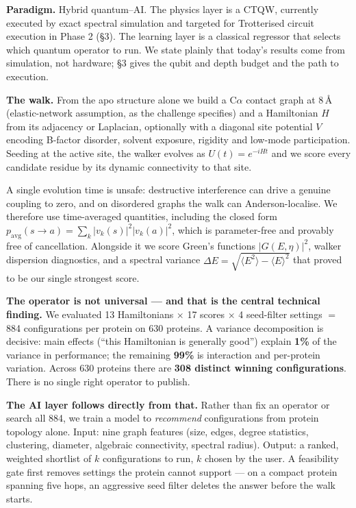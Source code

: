 \documentclass[10pt,a4paper,twocolumn]{article}
\newcommand{\num}[1]{\textbf{#1}}
\begin{document}
\textbf{Paradigm.} Hybrid quantum--AI. The physics layer is a CTQW, currently executed by exact
spectral simulation and targeted for Trotterised circuit execution in Phase 2 (\S3). The learning
layer is a classical regressor that selects which quantum operator to run. We state plainly that
today's results come from simulation, not hardware; \S3 gives the qubit and depth budget and the
path to execution.

\textbf{The walk.} From the apo structure alone we build a C$\alpha$ contact graph at 8\,\AA{}
(elastic-network assumption, as the challenge specifies) and a Hamiltonian $H$ from its adjacency
or Laplacian, optionally with a diagonal site potential $V$ encoding B-factor disorder, solvent
exposure, rigidity and low-mode participation. Seeding at the active site, the walker evolves as
$U(t)=e^{-iHt}$ and we score every candidate residue by its dynamic connectivity to that site.

A single evolution time is unsafe: destructive interference can drive a genuine coupling to zero,
and on disordered graphs the walk can Anderson-localise. We therefore use time-averaged
quantities, including the closed form
$p_{\mathrm{avg}}(s\!\to\!a)=\sum_k |v_k(s)|^2|v_k(a)|^2$,
which is parameter-free and provably free of cancellation. Alongside it we score Green's functions
$|G(E,\eta)|^2$, walker dispersion diagnostics, and a spectral variance
$\Delta E=\sqrt{\langle E^2\rangle-\langle E\rangle^2}$ that proved to be our single strongest
score.

\textbf{The operator is not universal --- and that is the central technical finding.} We evaluated
13 Hamiltonians $\times$ 17 scores $\times$ 4 seed-filter settings $=$ 884 configurations per
protein on 630 proteins. A variance decomposition is decisive: main effects (``this Hamiltonian is
generally good'') explain \num{1\%} of the variance in performance; the remaining \num{99\%} is
interaction and per-protein variation. Across 630 proteins there are \num{308 distinct winning
configurations}. There is no single right operator to publish.

\textbf{The AI layer follows directly from that.} Rather than fix an operator or search all 884,
we train a model to \emph{recommend} configurations from protein topology alone. Input: nine graph
features (size, edges, degree statistics, clustering, diameter, algebraic connectivity, spectral
radius). Output: a ranked, weighted shortlist of $k$ configurations to run, $k$ chosen by the user.
A feasibility gate first removes settings the protein cannot support --- on a compact protein
spanning five hops, an aggressive seed filter deletes the answer before the walk starts.
\end{document}
